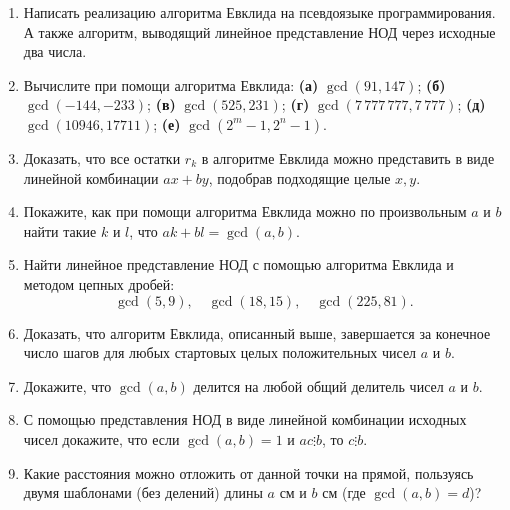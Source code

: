 \begin{enumerate}
\item Написать реализацию алгоритма Евклида на псевдоязыке программирования. А также алгоритм, выводящий линейное представление НОД через исходные два числа.
\item Вычислите при помощи алгоритма Евклида: \textbf{(а)} $\gcd(91, 147)$;
\textbf{(б)} $\gcd(-144, -233)$; \textbf{(в)} $\gcd(525, 231)$; \textbf{(г)} $\gcd(7\,777\,777, 7\,777)$;
\textbf{(д)} $\gcd(10946, 17711)$; \textbf{(е)} $\gcd(2^m-1, 2^n-1)$.

\item Доказать, что все остатки $r_k$ в алгоритме Евклида можно представить в виде линейной комбинации $ax+by$, подобрав подходящие целые $x,y$.

\item Покажите, как при помощи алгоритма Евклида можно по произвольным $a$ и $b$ 
найти такие $k$ и $l$, что $ak + bl = \gcd(a, b)$.

\item Найти линейное представление НОД с помощью алгоритма Евклида и методом цепных дробей:
$$
\gcd(5,9),\quad \gcd(18,15),\quad \gcd(225,81).
$$

\item Доказать, что алгоритм Евклида, описанный выше, завершается за конечное число шагов для любых стартовых целых положительных чисел $a$ и $b$.

\item Докажите, что $\gcd(a,b)$ делится на любой общий делитель чисел $a$ и $b$.

\item С помощью представления НОД в виде линейной комбинации исходных чисел докажите, что если $\gcd(a, b) = 1$ и $ac\vdots b$, то $c\vdots b$.

\item Какие расстояния можно отложить от данной точки на прямой, пользуясь двумя шаблонами
 (без делений) длины $a$ см и $b$ см (где $\gcd(a, b) = d$)?
\end{enumerate}

